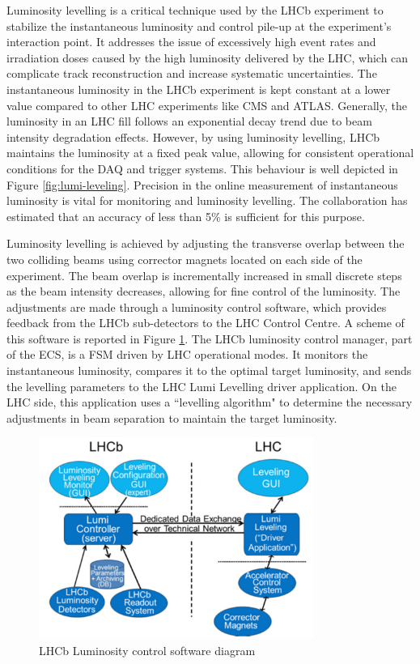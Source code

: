 Luminosity levelling is a critical technique used by the LHCb experiment to stabilize the instantaneous luminosity and control pile-up at the experiment's interaction point. It addresses the issue of excessively high event rates and irradiation doses caused by the high luminosity delivered by the LHC, which can complicate track reconstruction and increase systematic uncertainties.
The instantaneous luminosity in the LHCb experiment is kept constant at a lower value compared to other LHC experiments like CMS and ATLAS. Generally, the luminosity in an LHC fill follows an exponential decay trend due to beam intensity degradation effects. However, by using luminosity levelling, LHCb maintains the luminosity at a fixed peak value, allowing for consistent operational conditions for the DAQ and trigger systems.  This behaviour is well depicted in Figure \ref{fig:lumi-leveling}. Precision in the online measurement of instantaneous luminosity is vital for monitoring and luminosity levelling. The collaboration has estimated that an accuracy of less than 5\% is sufficient for this purpose. 


Luminosity levelling is achieved by adjusting the transverse overlap between the two colliding beams using corrector magnets located on each side of the experiment. The beam overlap is incrementally increased in small discrete steps as the beam intensity decreases, allowing for fine control of the luminosity. The adjustments are made through a luminosity control software, which provides feedback from the LHCb sub-detectors to the LHC Control Centre. A scheme of this software is reported in Figure \ref{fig:lumi-control}.
The LHCb luminosity control manager, part of the ECS, is a FSM driven by LHC operational modes. It monitors the instantaneous luminosity, compares it to the optimal target luminosity, and sends the levelling parameters to the LHC Lumi Levelling driver application. On the LHC side, this application uses a ``levelling algorithm" to determine the necessary adjustments in beam separation to maintain the target luminosity.

\begin{figure}
    \centering
    \includegraphics[width=0.8\textwidth]{figures/lumi_control.png}
    \caption{LHCb Luminosity control software diagram}
    \label{fig:lumi-control}
\end{figure}


